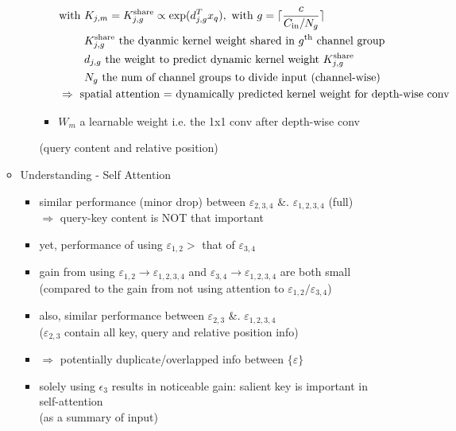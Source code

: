 \begin{itemize}
\begin{itemize}
\begin{itemize}
\begin{itemize}
			$\begin{alignedat}{1}
			& \text{with } K_{j, m} = K_{j, g}^\text{share} \propto\exp(d_{j,g}^T x_q), \text{ with } g=\ceil{\frac{c}{C_\text{in} / N_g}} \\
			& \phantom{\text{with }} K_{j, g}^\text{share} \text{ the dyanmic kernel weight shared in } g^\text{th} \text{ channel group}\\ 
			& \phantom{\text{with }} d_{j,g} \text{ the weight to predict dynamic kernel weight } K_{j, g}^\text{share} \\ 
			& \phantom{\text{with }} N_g \text{ the num of channel groups to divide input (channel-wise)} \\
			& \Rightarrow \text{ spatial attention = dynamically predicted kernel weight for depth-wise conv} \\
			\end{alignedat}$
			\item $W_m$ a learnable weight i.e. the 1x1 conv after depth-wise conv
			\end{itemize}
		(query content and relative position)
		\end{itemize}
	\item Understanding - Self Attention
		\begin{itemize}
		\item similar performance (minor drop) between $\varepsilon_{2,3,4}$ \&. $\varepsilon_{1,2,3,4}$ (full) \\
		$\Rightarrow$ query-key content is NOT that important
		\item yet, performance of using $\varepsilon_{1,2} > $ that of $\varepsilon_{3,4}$
		\item gain from using $\varepsilon_{1,2} \rightarrow \varepsilon_{1,2,3,4}$ and $\varepsilon_{3,4}\rightarrow\varepsilon_{1,2,3,4}$ are both small \\
		(compared to the gain from not using attention to $\varepsilon_{1,2}/\varepsilon_{3,4}$)
		\item also, similar performance between $\varepsilon_{2,3}$ \&. $\varepsilon_{1,2,3,4}$ \\
		($\varepsilon_{2,3}$ contain all key, query and relative position info)
		\item $\Rightarrow$ potentially duplicate/overlapped info between $\{\varepsilon\}$
		\item solely using $\epsilon_3$ results in noticeable gain: salient key is important in self-attention \\
		(as a summary of input)
		\end{itemize}

\end{itemize}
\end{itemize}
